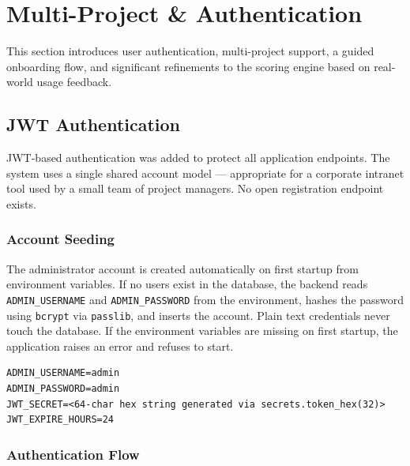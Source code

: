 \documentclass[12pt, a4paper]{article}
\begin{document}
\section{Multi-Project \& Authentication}

This section introduces user authentication, multi-project support, a guided onboarding flow, and significant refinements to the scoring engine based on real-world usage feedback.

\subsection{JWT Authentication}

JWT-based authentication was added to protect all application endpoints. The system uses a single shared account model — appropriate for a corporate intranet tool used by a small team of project managers. No open registration endpoint exists.

\subsubsection{Account Seeding}

The administrator account is created automatically on first startup from environment variables. If no users exist in the database, the backend reads \texttt{ADMIN\_USERNAME} and \texttt{ADMIN\_PASSWORD} from the environment, hashes the password using \texttt{bcrypt} via \texttt{passlib}, and inserts the account. Plain text credentials never touch the database. If the environment variables are missing on first startup, the application raises an error and refuses to start.

\begin{lstlisting}[caption={Required environment variables}]
ADMIN_USERNAME=admin
ADMIN_PASSWORD=admin
JWT_SECRET=<64-char hex string generated via secrets.token_hex(32)>
JWT_EXPIRE_HOURS=24
\end{lstlisting}

\subsubsection{Authentication Flow}
\end{document}
